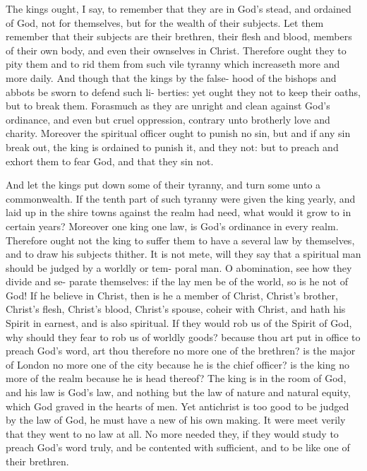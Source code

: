 \documentclass{custom}
\begin{document}
The kings ought, I say, to remember that they are in 
God's stead, and ordained of God, not for themselves, but 
for the wealth of their subjects. Let them remember that 
their subjects are their brethren, their flesh and blood, 
members of their own body, and even their ownselves in 
Christ. Therefore ought they to pity them and to rid 
them from such vile tyranny which increaseth more and 
more daily. And though that the kings by the false- 
hood of the bishops and abbots be sworn to defend such li- 
berties: yet ought they not to keep their oaths, but to 
break them. Forasmuch as they are unright and clean 
against God's ordinance, and even but cruel oppression, 
contrary unto brotherly love and charity. Moreover the 
spiritual officer ought to punish no sin, but and if any sin 
break out, the king is ordained to punish it, and they not: 
but to preach and exhort them to fear God, and that they 
sin not. 

And let the kings put down some of their tyranny, and 
turn some unto a commonwealth. If the tenth part of 
such tyranny were given the king yearly, and laid up in the 
shire towns against the realm had need, what would it grow 
to in certain years? Moreover one king one law, is God's 
ordinance in every realm. Therefore ought not the king to 
suffer them to have a several law by themselves, and to 
draw his subjects thither. It is not mete, will they say 
that a spiritual man should be judged by a worldly or tem- 
poral man. O abomination, see how they divide and se- 
parate themselves: if the lay men be of the world, so is he 
not of God! If he believe in Christ, then is he a member 
of Christ, Christ's brother, Christ's flesh, Christ's blood, 
Christ's spouse, coheir with Christ, and hath his Spirit 
in earnest, and is also spiritual. If they would rob us of 
the Spirit of God, why should they fear to rob us of 
worldly goods? because thou art put in office to preach 
God's word, art thou therefore no more one of the 
brethren? is the major of London no more one of the city 
because he is the chief officer? is the king no more of the 
realm because he is head thereof? The king is in the room 
of God, and his law is God's law, and nothing but the law 
of nature and natural equity, which God graved in the 
hearts of men. Yet antichrist is too good to be judged 
by the law of God, he must have a new of his own making. 
It were meet verily that they went to no law at all. No 
more needed they, if they would study to preach God's word 
truly, and be contented with sufficient, and to be like one 
of their brethren. 
\end{document}
